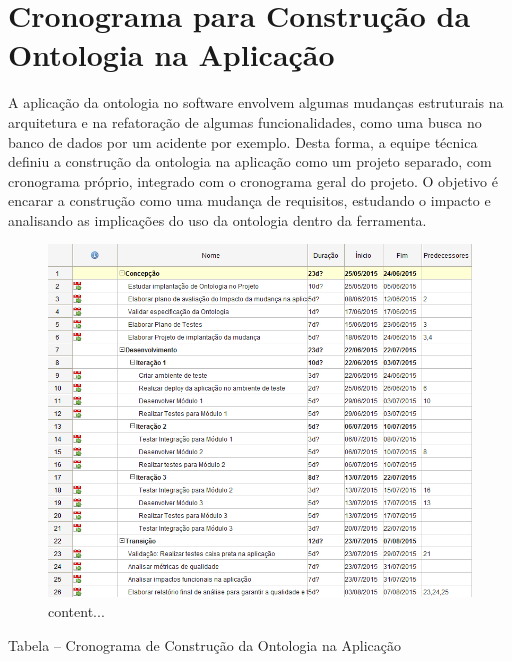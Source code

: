 \section{Cronograma para Construção da Ontologia na Aplicação}

A aplicação da ontologia no software envolvem algumas mudanças estruturais na arquitetura e
na refatoração de algumas funcionalidades, como uma busca no banco de dados por um acidente por 
exemplo. Desta forma, a equipe técnica definiu a construção da ontologia na aplicação como um projeto
separado, com cronograma próprio, integrado com o cronograma geral do projeto.
O objetivo é encarar a construção como uma mudança de requisitos, estudando o impacto e analisando
as implicações do uso da ontologia dentro da ferramenta.

\begin{figure}[h]
	\centering
	\includegraphics{Figuras/cronograma_construcao_ontologia.png}
	content...
\end{figure}

\pagebreak

Tabela – Cronograma de Construção da Ontologia na Aplicação